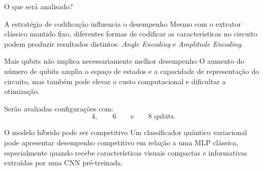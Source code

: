 \begin{frame}{O que será analisado?}

\begin{block}{A estratégia de codificação influencia o desempenho}
Mesmo com o extrator clássico mantido fixo, diferentes formas de codificar
as características no circuito podem produzir resultados distintos:
\textit{Angle Encoding}
e
\textit{Amplitude Encoding}.
\end{block}

\begin{block}{Mais qubits não implica necessariamente melhor desempenho}
O aumento do número de qubits amplia o espaço de estados e a capacidade
de representação do circuito, mas também pode elevar o custo computacional
e dificultar a otimização.

Serão avaliadas configurações com:
\[
4,\qquad 6 \qquad \text{e} \qquad 8 \text{ qubits}.
\]
\end{block}

\begin{block}{O modelo híbrido pode ser competitivo}
Um classificador quântico variacional pode apresentar desempenho competitivo
em relação a uma MLP clássica, especialmente quando recebe características
visuais compactas e informativas extraídas por uma CNN pré-treinada.
\end{block}

\end{frame}

